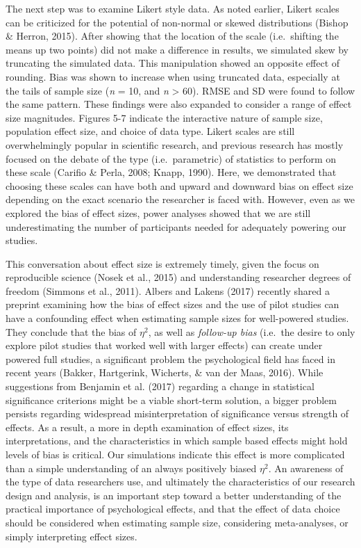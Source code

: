 \documentclass[english,man]{apa6}
\theoremstyle{definition}
\theoremstyle{definition}
\theoremstyle{definition}
\theoremstyle{remark}
\begin{document}
The next step was to examine Likert style data. As noted earlier, Likert
scales can be criticized for the potential of non-normal or skewed
distributions (Bishop \& Herron, 2015). After showing that the location
of the scale (i.e.~shifting the means up two points) did not make a
difference in results, we simulated skew by truncating the simulated
data. This manipulation showed an opposite effect of rounding. Bias was
shown to increase when using truncated data, especially at the tails of
sample size (\emph{n} = 10, and \emph{n} \textgreater{} 60). RMSE and SD
were found to follow the same pattern. These findings were also expanded
to consider a range of effect size magnitudes. Figures 5-7 indicate the
interactive nature of sample size, population effect size, and choice of
data type. Likert scales are still overwhelmingly popular in scientific
research, and previous research has mostly focused on the debate of the
type (i.e.~parametric) of statistics to perform on these scale (Carifio
\& Perla, 2008; Knapp, 1990). Here, we demonstrated that choosing these
scales can have both and upward and downward bias on effect size
depending on the exact scenario the researcher is faced with. However,
even as we explored the bias of effect sizes, power analyses showed that
we are still underestimating the number of participants needed for
adequately powering our studies.

This conversation about effect size is extremely timely, given the focus
on reproducible science (Nosek et al., 2015) and understanding
researcher degrees of freedom (Simmons et al., 2011). Albers and Lakens
(2017) recently shared a preprint examining how the bias of effect sizes
and the use of pilot studies can have a confounding effect when
estimating sample sizes for well-powered studies. They conclude that the
bias of \(\eta^2\), as well as \emph{follow-up bias} (i.e.~the desire to
only explore pilot studies that worked well with larger effects) can
create under powered full studies, a significant problem the
psychological field has faced in recent years (Bakker, Hartgerink,
Wicherts, \& van der Maas, 2016). While suggestions from Benjamin et al.
(2017) regarding a change in statistical significance criterions might
be a viable short-term solution, a bigger problem persists regarding
widespread misinterpretation of significance versus strength of effects.
As a result, a more in depth examination of effect sizes, its
interpretations, and the characteristics in which sample based effects
might hold levels of bias is critical. Our simulations indicate this
effect is more complicated than a simple understanding of an always
positively biased \(\eta^2\). An awareness of the type of data
researchers use, and ultimately the characteristics of our research
design and analysis, is an important step toward a better understanding
of the practical importance of psychological effects, and that the
effect of data choice should be considered when estimating sample size,
considering meta-analyses, or simply interpreting effect sizes.
\end{document}
